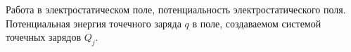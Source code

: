 \documentclass[__main__.tex]{subfiles}
\begin{document}
Работа в электростатическом поле, потенциальность электростатического поля. Потенциальная энергия точечного заряда $q$ в поле, создаваемом системой точечных зарядов $Q_j$.\\ 

\end{document}
